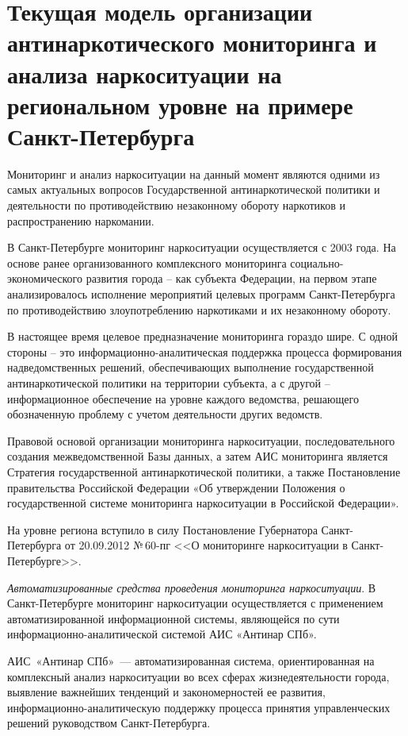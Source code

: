 \section{Текущая модель организации антинаркотического мониторинга и анализа
наркоситуации на региональном уровне на примере Санкт-Петербурга}

Мониторинг и анализ наркоситуации на данный момент являются одними из самых
актуальных вопросов Государственной антинаркотической политики и деятельности по
противодействию незаконному обороту наркотиков и распространению наркомании. 

В Санкт-Петербурге мониторинг наркоситуации осуществляется с 2003 года. На
основе ранее организованного комплексного мониторинга социально-экономического
развития города – как субъекта Федерации, на первом этапе  анализировалось
исполнение мероприятий целевых программ Санкт-Петербурга по противодействию
злоупотреблению наркотиками и их незаконному обороту.

В настоящее время целевое предназначение мониторинга гораздо шире. С одной
стороны – это информационно-аналитическая поддержка процесса формирования
надведомственных решений, обеспечивающих выполнение государственной
антинаркотической политики на территории субъекта, а с другой – информационное
обеспечение на уровне каждого ведомства, решающего обозначенную проблему с
учетом деятельности других ведомств.

Правовой основой организации мониторинга наркоситуации, последовательного
создания межведомственной Базы данных, а затем АИС мониторинга является
Стратегия государственной антинаркотической политики, а также Постановление
правительства Российской Федерации «Об утверждении Положения о государственной
системе мониторинга наркоситуации в Российской Федерации».

На уровне региона вступило в силу Постановление Губернатора Санкт-Петербурга от
20.09.2012 №\,60-пг <<О мониторинге наркоситуации в Санкт-Петербурге>>.

\textit{Автоматизированные средства проведения мониторинга наркоситуации}.
В Санкт-Петербурге мониторинг наркоситуации осуществляется с применением
автоматизированной информационной системы, являющейся по сути
информационно-аналитической системой АИС «Антинар СПб».

АИС~«Антинар СПб»~--- автоматизированная система, ориентированная  на комплексный
анализ наркоситуации во всех сферах  жизнедеятельности города, выявление
важнейших тенденций и закономерностей ее развития, информационно-аналитическую
поддержку процесса принятия управленческих решений руководством
Санкт-Петербурга.

